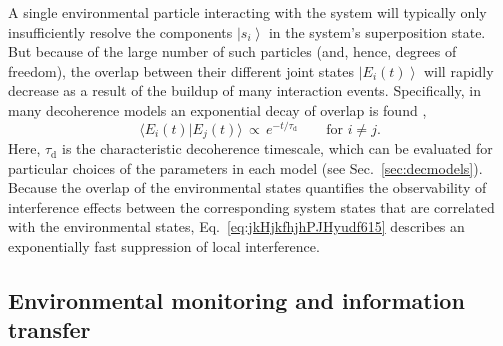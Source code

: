 \documentclass[3p,sort&compress]{elsarticle}
\newcommand{\ket}[1]{\left\vert{#1}\right\rangle}
\newcommand{\braket}[2]{\ensuremath{{\langle #1}|{#2 \rangle}}}
\newcommand{\E}{\ensuremath{e}}
\begin{document}
A single environmental particle interacting with the system will typically only insufficiently resolve the components $\ket{s_i}$ in the system's superposition state. But because of the large number of such particles (and, hence, degrees of freedom), the overlap between their different joint states $\ket{E_i(t)}$ will rapidly decrease as a result of the buildup of many interaction events. Specifically, in many decoherence models an exponential decay of overlap is found \cite{Zurek:1982:tv,Joos:1985:iu,Paz:1993:ta,Leggett:1987:pm,Mokarzel:2002:za,Hornberger:2003:un,Zurek:2002:ii,Schlosshauer:2007:un,Breuer:2002:oq},
%
\begin{equation}
  \label{eq:jkHjkfhjhPJHyudf615}
  \braket{E_i(t)}{E_j(t)} \, \propto \, \E^{-t/\tau_\text{d}} \qquad \text{for $i \not= j$}.
\end{equation}
%
Here, $\tau_\text{d}$ is the characteristic decoherence timescale, which can be evaluated for particular choices of the parameters in each model (see Sec.~\ref{sec:decmodels}). Because the overlap of the environmental states quantifies the observability of interference effects between the corresponding system states that are correlated with the environmental states, Eq.~\eqref{eq:jkHjkfhjhPJHyudf615} describes an exponentially fast suppression of local interference.

\subsection{\label{sec:envir-monit-inform}Environmental monitoring and information transfer}
\end{document}
